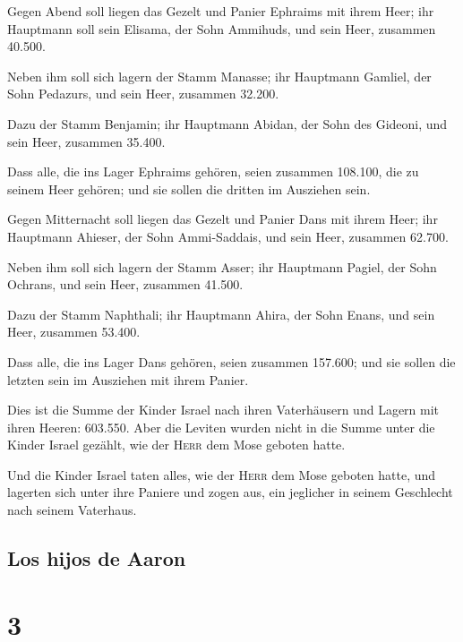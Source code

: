  Gegen Abend soll liegen das Gezelt und Panier Ephraims
mit ihrem Heer; ihr Hauptmann soll sein Elisama, der Sohn Ammihuds,
 und sein Heer, zusammen 40.500.

 Neben ihm soll sich lagern der Stamm Manasse; ihr
Hauptmann Gamliel, der Sohn Pedazurs,  und sein Heer,
zusammen 32.200.

 Dazu der Stamm Benjamin; ihr Hauptmann Abidan, der Sohn
des Gideoni,  und sein Heer, zusammen 35.400.

 Dass alle, die ins Lager Ephraims gehören, seien
zusammen 108.100, die zu seinem Heer gehören; und sie sollen die dritten
im Ausziehen sein.

 Gegen Mitternacht soll liegen das Gezelt und Panier Dans
mit ihrem Heer; ihr Hauptmann Ahieser, der Sohn Ammi-Saddais,
 und sein Heer, zusammen 62.700.

 Neben ihm soll sich lagern der Stamm Asser; ihr
Hauptmann Pagiel, der Sohn Ochrans,  und sein Heer,
zusammen 41.500.

 Dazu der Stamm Naphthali; ihr Hauptmann Ahira, der Sohn
Enans,  und sein Heer, zusammen 53.400.

 Dass alle, die ins Lager Dans gehören, seien zusammen
157.600; und sie sollen die letzten sein im Ausziehen mit ihrem Panier.

 Dies ist die Summe der Kinder Israel nach ihren
Vaterhäusern und Lagern mit ihren Heeren: 603.550.  Aber
die Leviten wurden nicht in die Summe unter die Kinder Israel gezählt,
wie der \textsc{Herr} dem Mose geboten hatte.

 Und die Kinder Israel taten alles, wie der \textsc{Herr}
dem Mose geboten hatte, und lagerten sich unter ihre Paniere und zogen
aus, ein jeglicher in seinem Geschlecht nach seinem Vaterhaus.

\hypertarget{los-hijos-de-aaron}{%
\subsection{Los hijos de Aaron}\label{los-hijos-de-aaron}}

\hypertarget{section-2}{%
\section{3}\label{section-2}}

